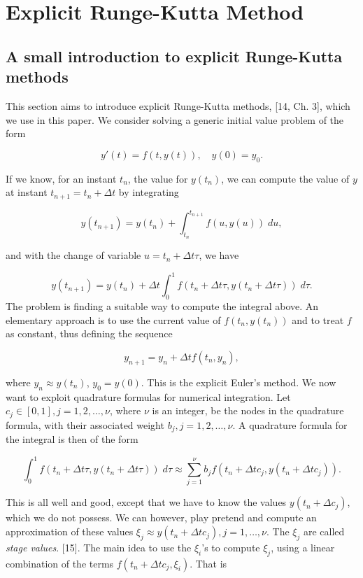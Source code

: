 \documentclass[
  letterpaper,
]{report}
\theoremstyle{plain}
\theoremstyle{definition}
\theoremstyle{definition}
\theoremstyle{remark}
\begin{document}

\hypertarget{explicit-runge-kutta-method}{%
\chapter{Explicit Runge-Kutta
Method}\label{explicit-runge-kutta-method}}

\hypertarget{a-small-introduction-to-explicit-runge-kutta-methods}{%
\section{A small introduction to explicit Runge-Kutta
methods}\label{a-small-introduction-to-explicit-runge-kutta-methods}}

This section aims to introduce explicit Runge-Kutta methods, {[}14, Ch.
3{]}, which we use in this paper. We consider solving a generic initial
value problem of the form

\[
y'(t) = f(t,y(t)), \quad y(0) = y_0.
\]

If we know, for an instant \(t_n\), the value for \(y(t_n)\), we can
compute the value of \(y\) at instant \(t_{n+1} = t_n +\Delta t\) by
integrating

\[
y(t_{n+1}) = y(t_n) + \int_{t_n}^{t_{n+1}}f(u,y(u))\; du,
\]

and with the change of variable \(u = t_n + \Delta t\tau\), we have

\[
y(t_{n+1}) = y(t_n) + \Delta t\int_0^1f(t_n+\Delta t\tau,y(t_n+\Delta t\tau)) \; d\tau.
\] The problem is finding a suitable way to compute the integral above.
An elementary approach is to use the current value of \(f(t_n,y(t_n))\)
and to treat \(f\) as constant, thus defining the sequence

\[
y_{n+1} = y_n + \Delta tf(t_n,y_n),
\]

where \(y_{n} \approx y(t_{n})\), \(y_0 = y(0)\). This is the explicit
Euler's method. We now want to exploit quadrature formulas for numerical
integration. Let \(c_j \in [0,1], j=1,2,\dots, \nu\), where \(\nu\) is
an integer, be the nodes in the quadrature formula, with their
associated weight \(b_j, j=1,2,\dots, \nu\). A quadrature formula for
the integral is then of the form

\[
\int_0^1 f(t_n+\Delta t \tau,y(t_n+\Delta t\tau))\; d\tau \approx \sum_{j=1}^\nu b_j f(t_n + \Delta t c_j,y(t_n+\Delta t c_j)).
\]

This is all well and good, except that we have to know the values
\(y(t_n+\Delta c_j)\), which we do not possess. We can however, play
pretend and compute an approximation of these values
\(\xi_j \approx y(t_n+\Delta t c_j), j=1,\dots, \nu\). The \(\xi_j\) are
called \emph{stage values}. {[}15{]}. The main idea to use the
\(\xi_i\)'s to compute \(\xi_j\), using a linear combination of the
terms \(f(t_n + \Delta t c_j, \xi_i)\). That is
\end{document}
